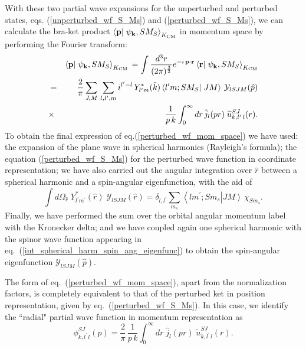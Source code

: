 \documentclass[aps,twocolumn,showpacs,preprintnumbers,amsmath,amssymb,nofootinbib,superscriptaddress,showkeys,noeprint]{revtex4-1}
\newcommand{\nk}{{\bf k}}
\newcommand{\np}{{\bf p}}
\newcommand{\nr}{{\bf r}}
\begin{document}
With these two partial wave expansions for the unperturbed and
perturbed states, eqs. (\ref{unperturbed_wf_S_Ms}) and
(\ref{perturbed_wf_S_Ms}), we can calculate the bra-ket product
$\left\langle \np \right| \left. \psi_{\nk}, S M_S
\right\rangle_{K_{\rm CM}}$ in momentum space by performing the
Fourier transform:
\begin{eqnarray}
&&\left\langle \np \right| \left. \psi_{\nk},SM_S \right\rangle_{K_{\rm CM}} \,
= \int \frac{d^3r}{(2\pi)^{\frac32}}e^{-i\,\np \cdot \nr}
\left\langle \nr\right| \left. \psi_{\nk},SM_S\right\rangle_{K_{\rm CM}}
\nonumber\\
&=&\frac{2}{\pi} \sum_{J,M}\,\sum_{l,l^\prime,m} i^{l^\prime-l}\,
Y^*_{l^\prime m}(\hat{k}) 
\left\langle l^\prime m; SM_S\right|\left.JM\right\rangle\,
\mathcal{Y}_{lSJM}(\hat{p})\nonumber\\
&\times&\frac{1}{p\,k}\int^\infty_0 dr\,  \hat{j}_l(pr)\; 
\widetilde{u}^{SJ}_{k,l^\prime\,l}(r).\label{perturbed_wf_mom_space}
\end{eqnarray}
To obtain the final expression of eq.(\ref{perturbed_wf_mom_space}) we
have used: the expansion of the plane wave in spherical harmonics
(Rayleigh's formula); the equation (\ref{perturbed_wf_S_Ms}) for the
perturbed wave function in coordinate representation; we have also
carried out the angular integration over $\hat{r}$ between a spherical
harmonic and a spin-angular eigenfunction, with the aid of
\begin{equation}\label{int_spherical_harm_spin_ang_eigenfunc}
\int d\Omega_{\hat{r}}\; Y^*_{l^\prime m^\prime}(\hat{r})\;
\mathcal{Y}_{lSJM}(\hat{r})=\delta_{l,l^\prime}\sum_{m_s}
\left\langle l m^\prime; S m_s\right|\left. JM\right\rangle\,
\chi_{Sm_s}.
\end{equation} 
Finally, we have performed the sum over the orbital angular momentum
label with the Kronecker delta; and we have coupled again one
spherical harmonic with the spinor wave function appearing in
eq.~(\ref{int_spherical_harm_spin_ang_eigenfunc}) to obtain the
spin-angular eigenfunction $\mathcal{Y}_{lSJM}(\hat{p})$.

The form of eq.~(\ref{perturbed_wf_mom_space}), apart from the
normalization factors, is completely equivalent to that of the
perturbed ket in position representation, given by
eq.~(\ref{perturbed_wf_S_Ms}). In this case, we identify the ``radial"
partial wave function in momentum representation as
\begin{equation}\label{radial_wf_momentum_rep}
\phi_{k,l^\prime\,l}^{SJ}(p)= \frac{2}{\pi} \, \frac{1}{p\,k}
\int^{\infty}_0 dr\; \hat{j}_{l}(pr)\; \widetilde{u}^{SJ}_{k,l^\prime\,l}(r).
\end{equation}
\end{document}
